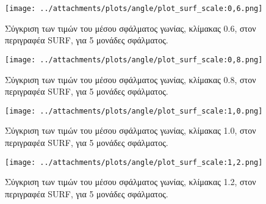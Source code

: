  \newpage
 
 \begin{figure}[ht!]
\begin{minipage}[b]{1.0\linewidth}
\centering
\texttt{[image: ../attachments/plots/angle/plot\_surf\_scale:0,6.png]}
\caption{Σύγκριση των τιμών του μέσου σφάλματος γωνίας, κλίμακας 0.6, στον περιγραφέα SURF, για 5 μονάδες σφάλματος.}
\label{figure:plot_scale_surf_high_0.6}
\end{minipage}
\end{figure} 
\begin{figure}[ht!]
\begin{minipage}[b]{1.0\linewidth}
\centering
\texttt{[image: ../attachments/plots/angle/plot\_surf\_scale:0,8.png]}
\caption{Σύγκριση των τιμών του μέσου σφάλματος γωνίας, κλίμακας 0.8, στον περιγραφέα SURF, για 5 μονάδες σφάλματος.}
\label{figure:plot_scale_surf_high_0.8}
\end{minipage}

 \end{figure} 
 
 
 
\newpage
 
 \begin{figure}[ht!]
\begin{minipage}[b]{1.0\linewidth}
\centering
\texttt{[image: ../attachments/plots/angle/plot\_surf\_scale:1,0.png]}
\caption{Σύγκριση των τιμών του μέσου σφάλματος γωνίας, κλίμακας 1.0, στον περιγραφέα SURF, για 5 μονάδες σφάλματος.}
\label{figure:plot_scale_surf_high_1.0}
\end{minipage}
\end{figure} 
\begin{figure}[ht!]
\begin{minipage}[b]{1.0\linewidth}
\centering
\texttt{[image: ../attachments/plots/angle/plot\_surf\_scale:1,2.png]}
\caption{Σύγκριση των τιμών του μέσου σφάλματος γωνίας, κλίμακας 1.2, στον περιγραφέα SURF, για 5 μονάδες σφάλματος.}
\label{figure:plot_scale_surf_high_1.2}
\end{minipage}

 \end{figure} 
 
 \newpage
 
